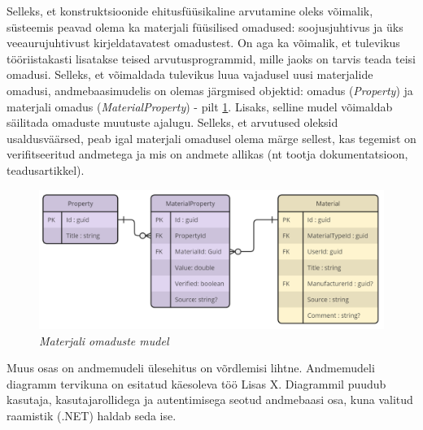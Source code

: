 Selleks, et konstruktsioonide ehitusfüüsikaline arvutamine oleks võimalik, süsteemis peavad olema ka 
materjali füüsilised omadused: soojusjuhtivus ja üks veeaurujuhtivust kirjeldatavatest omadustest. On 
aga ka võimalik, et tulevikus tööriistakasti lisatakse teised arvutusprogrammid, mille jaoks on tarvis teada
teisi omadusi. Selleks, et võimaldada tulevikus luua vajadusel uusi materjalide omadusi, andmebaasimudelis
on olemas järgmised objektid: omadus (\textit{Property}) ja materjali omadus (\textit{MaterialProperty}) - pilt 
\ref{fig:db_properties_model}. Lisaks, selline mudel võimaldab säilitada omaduste muutuste ajalugu.
Selleks, et arvutused oleksid usaldusväärsed, peab igal materjali omadusel olema märge sellest, kas 
tegemist on verifitseeritud andmetega ja mis on andmete allikas (nt tootja dokumentatsioon, teadusartikkel).

\begin{figure}[ht]
    \centering
    \includegraphics[width=.8\textwidth]{figures/analysis/db_desing_2.png}
    \caption[Materjali omaduste mudel]{\textit{Materjali omaduste mudel}}
    \label{fig:db_properties_model}
\end{figure}

Muus osas on andmemudeli ülesehitus on võrdlemisi lihtne. Andmemudeli diagramm tervikuna on esitatud käesoleva töö Lisas X.
Diagrammil puudub kasutaja, kasutajarollidega ja autentimisega seotud andmebaasi osa, kuna valitud raamistik (.NET) haldab
seda ise.